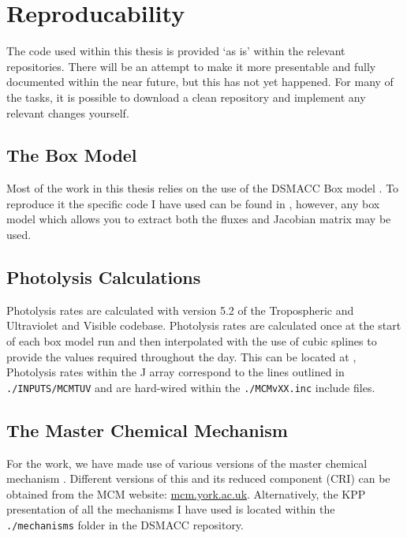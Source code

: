 \newpage

\section*{Reproducability}
%

The code used within this thesis is provided `as is' within the relevant repositories. There will be an attempt to make it more presentable and fully documented within the near future, but this has not yet happened. For many of the tasks, it is possible to download a clean repository and implement any relevant changes yourself.

\subsection*{The Box Model}

Most of the work in this thesis relies on the use of the DSMACC Box model \citep{dsmacc}. To reproduce it the specific code I have used can be found in \citep{dsmaccgit}, however, any box model which allows you to extract both the fluxes and Jacobian matrix may be used.

\subsection*{Photolysis Calculations}

Photolysis rates are calculated with version 5.2 of the Tropospheric and Ultraviolet and Visible codebase. Photolysis rates are calculated once at the start of each box model run and then interpolated with the use of cubic splines to provide the values required throughout the day. This can be located at \citep{tuv}, Photolysis rates within the J array correspond to the lines outlined in \verb|./INPUTS/MCMTUV| and are hard-wired within the \verb|./MCMvXX.inc| include files.

\subsection*{The Master Chemical Mechanism}
For the work, we have made use of various versions of the master chemical mechanism \citep{mcm}. Different versions of this and its reduced component (CRI) can be obtained from the MCM website: \url{mcm.york.ac.uk}. Alternatively, the KPP presentation of all the mechanisms I have used is located within the \verb|./mechanisms| folder in the DSMACC repository.


